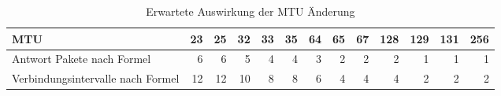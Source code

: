 \begin{table}
\centering
\caption{Erwartete Auswirkung der MTU Änderung}
\label{table:estimatedreadpakets}
\begin{tabular}{lrrrrrrrrrrrr}
\toprule
MTU &  23  &  25  &  32  &  33  &  35  &  64  &  65  &  67  &  128 &  129 &  131 &  256 \\
\midrule
Antwort Pakete nach Formel        &    6 &    6 &    5 &    4 &    4 &    3 &    2 &    2 &    2 &    1 &    1 &    1 \\
Verbindungsintervalle nach Formel &   12 &   12 &   10 &    8 &    8 &    6 &    4 &    4 &    4 &    2 &    2 &    2 \\
\bottomrule
\end{tabular}
\end{table}
